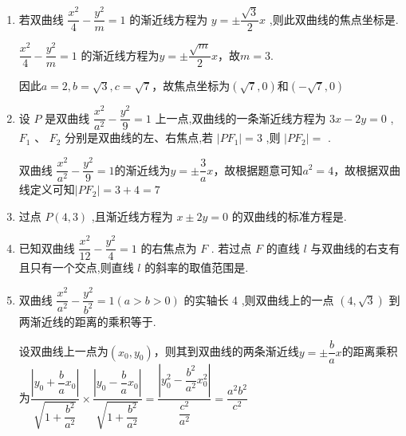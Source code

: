 \begin{enumerate}
\begin{jieda}
        因为$N$ 的轨迹是双曲线，所以$0 < 2m-1 < 6$，故$\dfrac{1}{2} < m < \dfrac{7}{2}$

        综上，$m \in \left(\dfrac{5}{2}, \dfrac{7}{2}\right)$
    \end{jieda}

    \item 若双曲线 $\dfrac{{x}^{2}}{4} - \dfrac{{y}^{2}}{m} = 1$ 的渐近线方程为 $y =  \pm  \dfrac{\sqrt{3}}{2}x$ ,则此双曲线的焦点坐标是.
    \begin{jieda}
         $\dfrac{{x}^{2}}{4} - \dfrac{{y}^{2}}{m} = 1$ 的渐近线方程为$y = \pm \dfrac{\sqrt{m}}{2}x$，故$m = 3$.

         因此$a = 2, b = \sqrt{3}, c = \sqrt{7}$，故焦点坐标为$\left(\sqrt{7}, 0\right)$和$\left(-\sqrt{7}, 0\right)$
    \end{jieda}

    \item 设 $P$ 是双曲线 $\dfrac{{x}^{2}}{{a}^{2}} - \dfrac{{y}^{2}}{9} = 1$ 上一点,双曲线的一条渐近线方程为 ${3x} - {2y} = 0$ ,${F}_{1}$ 、 ${F}_{2}$ 分别是双曲线的左、右焦点,若 $\left| {P{F}_{1}}\right|  = 3$ ,则 $\left| {P{F}_{2}}\right|  =$ .
    \begin{jieda}
        双曲线 $\dfrac{{x}^{2}}{{a}^{2}} - \dfrac{{y}^{2}}{9} = 1$的渐近线为$y = \pm \dfrac{3}{a}x$，故根据题意可知$a^2 = 4$，故根据双曲线定义可知$\left| {P{F}_{2}}\right| = 3+4 = 7$
    \end{jieda}

    \item 过点 $P\left( {4,3}\right)$ ,且渐近线方程为 $x \pm  {2y} = 0$ 的双曲线的标准方程是.

    \item 已知双曲线 $\dfrac{{x}^{2}}{12} - \dfrac{{y}^{2}}{4} = 1$ 的右焦点为 $F$ . 若过点 $F$ 的直线 $l$ 与双曲线的右支有且只有一个交点,则直线 $l$ 的斜率的取值范围是.

    \item 双曲线 $\dfrac{{x}^{2}}{{a}^{2}} - \dfrac{{y}^{2}}{{b}^{2}} = 1\left( {a > b > 0}\right)$ 的实轴长 4 ,则双曲线上的一点 $\left( {4,\sqrt{3}}\right)$ 到两渐近线的距离的乘积等于.
    \begin{jieda}
        设双曲线上一点为$(x_0, y_0)$，则其到双曲线的两条渐近线$y = \pm \dfrac{b}{a}x$的距离乘积为$\dfrac{\left|y_0 + \dfrac{b}{a}x_0\right|}{\sqrt{1+\dfrac{b^2}{a^2}}} \times \dfrac{\left|y_0 - \dfrac{b}{a}x_0\right|}{\sqrt{1+\dfrac{b^2}{a^2}}} = \dfrac{\left|y_0^2 - \dfrac{b^2}{a^2}x_0^2\right|}{\dfrac{c^2}{a^2}} = \dfrac{a^2b^2}{c^2}$


\end{jieda}
\end{enumerate}
